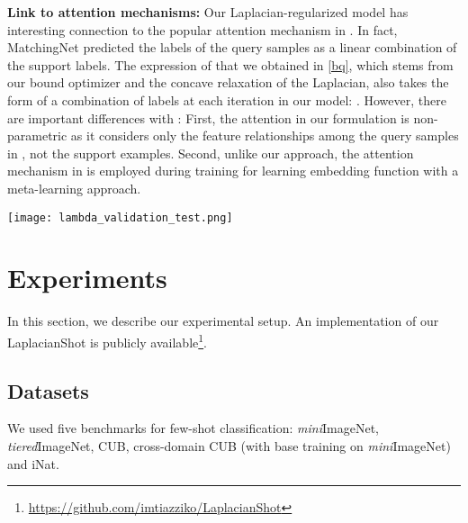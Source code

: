 \documentclass{article}
\begin{document}
\textbf{Link to attention mechanisms:} Our Laplacian-regularized model has interesting connection to the popular attention mechanism in \cite{Vaswani17}. In fact, MatchingNet \cite{Vinyals2016MatchingNF} predicted the labels of the query samples  as a linear combination of the support labels. The expression of  that we obtained in \eqref{bq}, which stems from our bound optimizer and the concave relaxation of the Laplacian, also takes the form of a combination of labels at each iteration  in our model: . However, there are
important differences with \cite{Vinyals2016MatchingNF}: First, the attention in our formulation is non-parametric as it considers only the feature relationships among the query samples in , not the support examples. Second, unlike our approach, the attention mechanism in \cite{Vinyals2016MatchingNF} is employed during training for learning embedding function  with a meta-learning approach.
\begin{figure*}
\vskip 0.1in
\begin{center}
\texttt{[image: lambda\_validation\_test.png]}
\caption{ We tune regularization parameter  over values ranging from 0.1 to 1.5. In the above plots, we show the impact of choosing  on both validation and test accuracies. The values of  based on the best validation accuracies correspond to good accuracies in the test classes. The results are shown for different networks on \textit{mini}ImageNet dataset, for both 1-shot (top row) and 5-shot (bottom row).}
\label{fig:lambda}
\end{center}
\vskip -0.2in
\end{figure*}
\section{Experiments}
In this section, we describe our experimental setup. An implementation of our LaplacianShot is publicly available\footnote{\hyperlink{https://github.com/imtiazziko/LaplacianShot}{https://github.com/imtiazziko/LaplacianShot}}.
\subsection{Datasets}
We used five benchmarks for few-shot classification: 
\textit{mini}ImageNet, \textit{tiered}ImageNet, CUB, cross-domain CUB (with base training on \textit{mini}ImageNet) and iNat.
\end{document}
